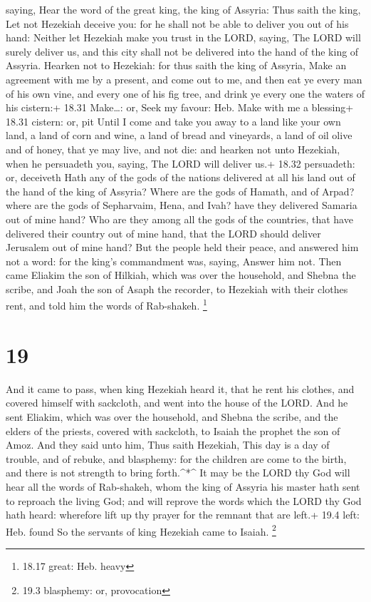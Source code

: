 saying, Hear the word of the great king, the king of Assyria:
 Thus saith the king, Let not Hezekiah deceive you: for he
shall not be able to deliver you out of his hand:  Neither
let Hezekiah make you trust in the LORD, saying, The LORD will surely
deliver us, and this city shall not be delivered into the hand of the
king of Assyria.  Hearken not to Hezekiah: for thus saith
the king of Assyria, Make an agreement with me by a present, and come
out to me, and then eat ye every man of his own vine, and every one of
his fig tree, and drink ye every one the waters of his cistern:+ 18.31
Make\ldots: or, Seek my favour: Heb. Make with me a blessing+ 18.31
cistern: or, pit  Until I come and take you away to a land
like your own land, a land of corn and wine, a land of bread and
vineyards, a land of oil olive and of honey, that ye may live, and not
die: and hearken not unto Hezekiah, when he persuadeth you, saying, The
LORD will deliver us.+ 18.32 persuadeth: or, deceiveth 
Hath any of the gods of the nations delivered at all his land out of the
hand of the king of Assyria?  Where are the gods of Hamath,
and of Arpad? where are the gods of Sepharvaim, Hena, and Ivah? have
they delivered Samaria out of mine hand?  Who are they
among all the gods of the countries, that have delivered their country
out of mine hand, that the LORD should deliver Jerusalem out of mine
hand?  But the people held their peace, and answered him
not a word: for the king's commandment was, saying, Answer him not.
 Then came Eliakim the son of Hilkiah, which was over the
household, and Shebna the scribe, and Joah the son of Asaph the
recorder, to Hezekiah with their clothes rent, and told him the words of
Rab-shakeh. \footnote{18.17 great: Heb. heavy}

\hypertarget{section-18}{%
\section{19}\label{section-18}}

 And it came to pass, when king Hezekiah heard it, that he
rent his clothes, and covered himself with sackcloth, and went into the
house of the LORD.  And he sent Eliakim, which was over the
household, and Shebna the scribe, and the elders of the priests, covered
with sackcloth, to Isaiah the prophet the son of Amoz.  And
they said unto him, Thus saith Hezekiah, This day is a day of trouble,
and of rebuke, and blasphemy: for the children are come to the birth,
and there is not strength to bring forth.\^{}*\^{}  It may
be the LORD thy God will hear all the words of Rab-shakeh, whom the king
of Assyria his master hath sent to reproach the living God; and will
reprove the words which the LORD thy God hath heard: wherefore lift up
thy prayer for the remnant that are left.+ 19.4 left: Heb. found
 So the servants of king Hezekiah came to Isaiah.
\footnote{19.3 blasphemy: or, provocation}

